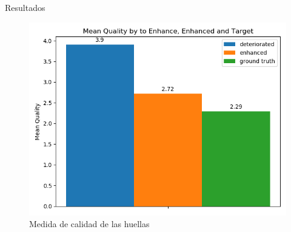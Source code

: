 \documentclass[12pt,aspectratio=169]{beamer}
\begin{document}
\begin{frame}{Resultados}

    \begin{figure}
        \includegraphics[scale=0.54]{figs/mean_qualities.png}
        \caption{Medida de calidad de las huellas}
    \end{figure}
    
\end{frame}
\end{document}
